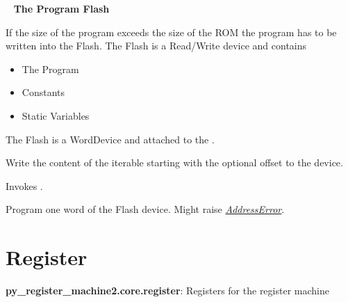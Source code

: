 \documentclass[letterpaper,10pt,english]{sphinxmanual}
\begin{document}
\begin{fulllineitems}
\label{core:py_register_machine2.core.device.Flash}~\label{core:flash}
\textbf{The Program Flash}

If the size of the program exceeds the size of the ROM the program has to be written into
the Flash. The Flash is a Read/Write device and contains
\begin{itemize}
\item {} 
The Program

\item {} 
Constants

\item {} 
Static Variables

\end{itemize}

The Flash is a WordDevice and attached to the  .

\begin{fulllineitems}
\label{core:py_register_machine2.core.device.Flash.program}
Write the content of the iterable  starting with the optional offset 
to the device.

Invokes .

\end{fulllineitems}


\begin{fulllineitems}
\label{core:py_register_machine2.core.device.Flash.program_word}
Program one word of the Flash device.
Might raise {\hyperref[core:addresserror]{\emph{AddressError}}}.

\end{fulllineitems}


\end{fulllineitems}



\section{Register}
\label{core:id1}\label{core:module-py_register_machine2.core.register}
\textbf{py\_register\_machine2.core.register}: Registers for the register machine
\end{document}

